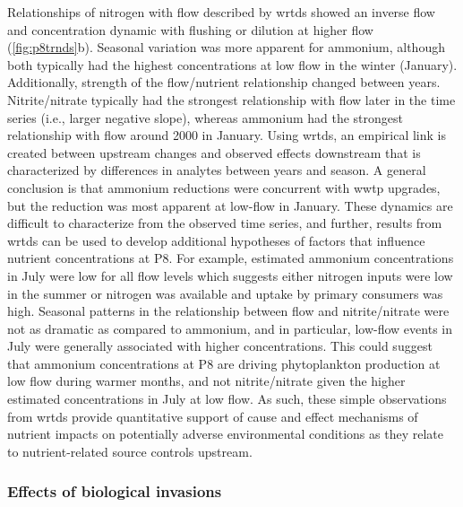 \documentclass[journal = esthag, manuscript = article]{achemso}\usepackage[]{graphicx}\usepackage[]{color}
\begin{document}
Relationships of nitrogen with flow described by \ac{wrtds} showed an inverse flow and concentration dynamic with flushing or dilution at higher flow (\cref{fig:p8trnds}b).  Seasonal variation was more apparent for ammonium, although both typically had the highest concentrations at low flow in the winter (January).  Additionally, strength of the flow/nutrient relationship changed between years. Nitrite/nitrate typically had the strongest relationship with flow later in the time series (i.e., larger negative slope), whereas ammonium had the strongest relationship with flow around 2000 in January.  Using \ac{wrtds}, an empirical link is created between upstream changes and observed effects downstream that is characterized by differences in analytes between years and season. A general conclusion is that ammonium reductions were concurrent with \ac{wwtp} upgrades, but the reduction was most apparent at low-flow in January.  These dynamics are difficult to characterize from the observed time series, and further, results from \ac{wrtds} can be used to develop additional hypotheses of factors that influence nutrient concentrations at P8. For example, estimated ammonium concentrations in July were low for all flow levels which suggests either nitrogen inputs were low in the summer or nitrogen was available and uptake by primary consumers was high. Seasonal patterns in the relationship between flow and nitrite/nitrate were not as dramatic as compared to ammonium, and in particular, low-flow events in July were generally associated with higher concentrations.  This could suggest that ammonium concentrations at P8 are driving phytoplankton production at low flow during warmer months, and not nitrite/nitrate given the higher estimated concentrations in July at low flow. As such, these simple observations from \ac{wrtds} provide quantitative support of cause and effect mechanisms of nutrient impacts on potentially adverse environmental conditions as they relate to nutrient-related source controls upstream.

\subsubsection{Effects of biological invasions}
\end{document}

